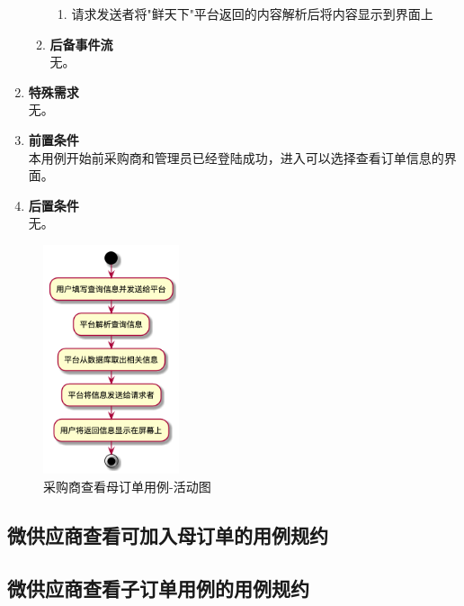\begin{enumerate}
\begin{enumerate}
\begin{enumerate}
            \item 请求发送者将"鲜天下"平台返回的内容解析后将内容显示到界面上

        \end{enumerate}
        \item \textbf{后备事件流}  \\ 无。
        
    \end{enumerate}
    \item \textbf{特殊需求} \\ 无。
    \item \textbf{前置条件} \\ 本用例开始前采购商和管理员已经登陆成功，进入可以选择查看订单信息的界面。
    \item \textbf{后置条件} \\ 无。
\end{enumerate}

\begin{figure}[htp]
    \centering
    \includegraphics[width=4cm]{image/chap01/uc_order_query.png}
    \caption{采购商查看母订单用例-活动图}
    \label{fig:uc_order_query-uml}
\end{figure}


\subsection{微供应商查看可加入母订单的用例规约}


\subsection{微供应商查看子订单用例的用例规约}

